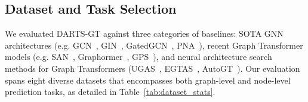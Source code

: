 \documentclass[lettersize,journal]{IEEEtran}
\begin{document}
\subsection{Dataset and Task Selection}

We evaluated DARTS-GT against three categories of baselines: SOTA GNN architectures (e.g. GCN~\cite{kipf_semi-supervised_2017}, GIN~\cite{xu_how_2019}, GatedGCN~\cite{bresson_residual_2018}, PNA~\cite{corso_principal_2020}), recent Graph Transformer models (e.g. SAN~\cite{kreuzer_rethinking_2021}, Graphormer~\cite{ying_transformers_2021}, GPS~\cite{rampa_recipe_nodate}), and neural architecture search methods for Graph Transformers (UGAS~\cite{song_towards_2025}, EGTAS~\cite{wang_automatic_2024}, AutoGT~\cite{zhang_autogt_2023}). Our evaluation spans eight diverse datasets that encompasses both graph-level and node-level prediction tasks, as detailed in Table~\ref{tab:dataset_stats}.

\begin{table}[!h]
\centering
\caption{Dataset Statistics and Characteristics}
\label{tab:dataset_stats}
\vspace{-3mm}
\end{table}
\end{document}

